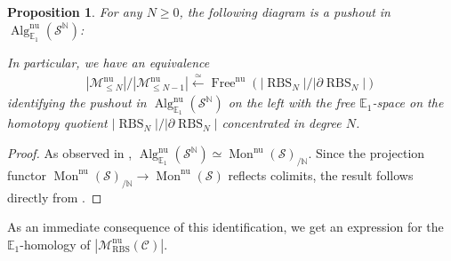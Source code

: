 \documentclass[12pt, reqno]{amsart}
\theoremstyle{plain}
\newtheorem{proposition}[theorem]{Proposition}
\theoremstyle{definition}
\newcommand{\N}{\mathbb N}
\begin{document}
\begin{proposition}\label{pushout in graded E1-spaces}
For any $N\geq 0$, the following diagram is a pushout in $\operatorname{Alg}_{\mathbb{E}_1}^{\operatorname{nu}}(\mathcal{S}^\N)$:
\begin{center}
\end{center}
In particular, we have an equivalence
\begin{align*}
|\mathscr{M}^{\operatorname{nu}}_{\leq N}|/|\mathscr{M}^{\operatorname{nu}}_{\leq N-1}| \xleftarrow{\simeq} \operatorname{Free}^{\operatorname{nu}}(|\operatorname{RBS}_N|/|\partial \operatorname{RBS}_N|)
\end{align*}
identifying the pushout in $\operatorname{Alg}_{\mathbb{E}_1}^{\operatorname{nu}}(\mathcal{S}^\N)$ on the left with the free $\mathbb{E}_1$-space on the homotopy quotient $|\operatorname{RBS}_N|/|\partial \operatorname{RBS}_N|$ concentrated in degree $N$.
\end{proposition}
\begin{proof}
As observed in , $\operatorname{Alg}_{\mathbb{E}_1}^{\operatorname{nu}}(\mathcal{S}^\N)\simeq \operatorname{Mon}^{\operatorname{nu}}(\mathcal{S})_{/\N}$. Since the projection functor $ \operatorname{Mon}^{\operatorname{nu}}(\mathcal{S})_{/\N}\rightarrow  \operatorname{Mon}^{\operatorname{nu}}(\mathcal{S})$ reflects colimits, the result follows directly from .
\end{proof}




As an immediate consequence of this identification, we get an expression for the $\mathbb{E}_1$-homology of $|\mathscr{M}_{\operatorname{RBS}}^{\operatorname{nu}}(\mathcal{C})|$.
\end{document}

